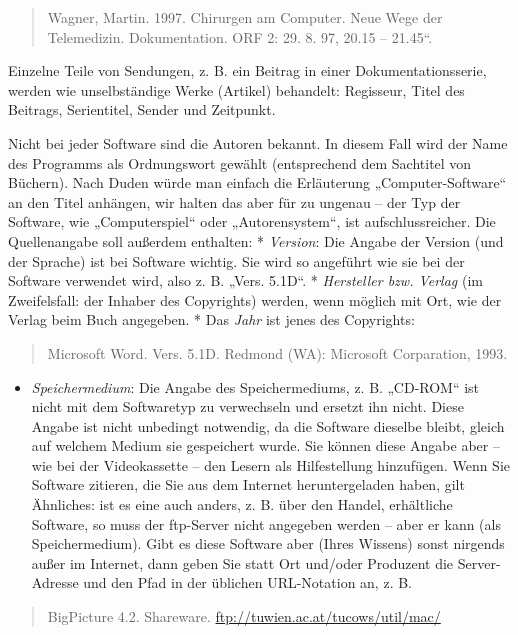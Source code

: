 \documentclass[]{book}
\providecommand{\tightlist}{%
  \setlength{\itemsep}{0pt}\setlength{\parskip}{0pt}}
\theoremstyle{definition}
\theoremstyle{definition}
\theoremstyle{definition}
\theoremstyle{remark}
\begin{document}
\begin{quote}
Wagner, Martin. 1997. Chirurgen am Computer. Neue Wege der Telemedizin.
Dokumentation. ORF 2: 29. 8. 97, 20.15 -- 21.45``.
\end{quote}

Einzelne Teile von Sendungen, z. B. ein Beitrag in einer
Dokumentationsserie, werden wie unselbständige Werke (Artikel)
behandelt: Regisseur, Titel des Beitrags, Serientitel, Sender und
Zeitpunkt.

Nicht bei jeder Software sind die Autoren bekannt. In diesem Fall wird
der Name des Programms als Ordnungswort gewählt (entsprechend dem
Sachtitel von Büchern). Nach Duden würde man einfach die Erläuterung
„Computer-Software`` an den Titel anhängen, wir halten das aber für zu
ungenau -- der Typ der Software, wie „Computerspiel`` oder
„Autorensystem``, ist aufschlussreicher. Die Quellenangabe soll außerdem
enthalten: * \emph{Version}: Die Angabe der Version (und der Sprache)
ist bei Software wichtig. Sie wird so angeführt wie sie bei der Software
verwendet wird, also z. B. „Vers. 5.1D``. * \emph{Hersteller bzw.
Verlag} (im Zweifelsfall: der Inhaber des Copyrights) werden, wenn
möglich mit Ort, wie der Verlag beim Buch angegeben. * Das \emph{Jahr}
ist jenes des Copyrights:

\begin{quote}
Microsoft Word. Vers. 5.1D. Redmond (WA): Microsoft Corparation, 1993.
\end{quote}

\begin{itemize}
\tightlist
\item
  \emph{Speichermedium}: Die Angabe des Speichermediums, z. B. „CD-ROM``
  ist nicht mit dem Softwaretyp zu verwechseln und ersetzt ihn nicht.
  Diese Angabe ist nicht unbedingt notwendig, da die Software dieselbe
  bleibt, gleich auf welchem Medium sie gespeichert wurde. Sie können
  diese Angabe aber -- wie bei der Videokassette -- den Lesern als
  Hilfestellung hinzufügen. Wenn Sie Software zitieren, die Sie aus dem
  Internet heruntergeladen haben, gilt Ähnliches: ist es eine auch
  anders, z. B. über den Handel, erhältliche Software, so muss der
  ftp-Server nicht angegeben werden -- aber er kann (als
  Speichermedium). Gibt es diese Software aber (Ihres Wissens) sonst
  nirgends außer im Internet, dann geben Sie statt Ort und/oder
  Produzent die Server-Adresse und den Pfad in der üblichen URL-Notation
  an, z. B.
\end{itemize}

\begin{quote}
BigPicture 4.2. Shareware. \url{ftp://tuwien.ac.at/tucows/util/mac/}
\end{quote}
\end{document}
